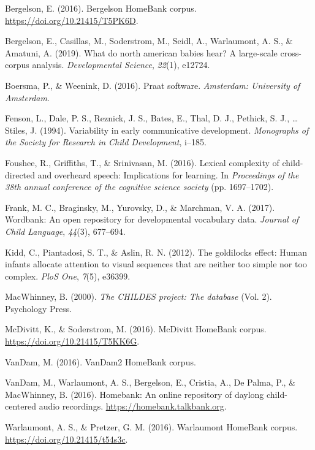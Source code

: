 \documentclass[10pt, letterpaper]{article}
\newenvironment{CSLReferences}%
  {}%
  {\par}
\begin{document}
\hypertarget{refs}{}
\begin{CSLReferences}{1}{0}
\leavevmode\hypertarget{ref-bergelsoncorpus}{}%
Bergelson, E. (2016). Bergelson HomeBank corpus.
\url{https://doi.org/10.21415/T5PK6D}.

\leavevmode\hypertarget{ref-bergelson2019north}{}%
Bergelson, E., Casillas, M., Soderstrom, M., Seidl, A., Warlaumont, A.
S., \& Amatuni, A. (2019). What do north american babies hear? A
large-scale cross-corpus analysis. \emph{Developmental Science},
\emph{22}(1), e12724.

\leavevmode\hypertarget{ref-boersma2016praat}{}%
Boersma, P., \& Weenink, D. (2016). Praat software. \emph{Amsterdam:
University of Amsterdam}.

\leavevmode\hypertarget{ref-fenson1994variability}{}%
Fenson, L., Dale, P. S., Reznick, J. S., Bates, E., Thal, D. J.,
Pethick, S. J., \ldots{} Stiles, J. (1994). Variability in early
communicative development. \emph{Monographs of the Society for Research
in Child Development}, i--185.

\leavevmode\hypertarget{ref-foushee2016lexical}{}%
Foushee, R., Griffiths, T., \& Srinivasan, M. (2016). Lexical complexity
of child-directed and overheard speech: Implications for learning. In
\emph{Proceedings of the 38th annual conference of the cognitive science
society} (pp. 1697--1702).

\leavevmode\hypertarget{ref-frank2017wordbank}{}%
Frank, M. C., Braginsky, M., Yurovsky, D., \& Marchman, V. A. (2017).
Wordbank: An open repository for developmental vocabulary data.
\emph{Journal of Child Language}, \emph{44}(3), 677--694.

\leavevmode\hypertarget{ref-kidd2012goldilocks}{}%
Kidd, C., Piantadosi, S. T., \& Aslin, R. N. (2012). The goldilocks
effect: Human infants allocate attention to visual sequences that are
neither too simple nor too complex. \emph{PloS One}, \emph{7}(5),
e36399.

\leavevmode\hypertarget{ref-macwhinney2000childes}{}%
MacWhinney, B. (2000). \emph{The CHILDES project: The database} (Vol.
2). Psychology Press.

\leavevmode\hypertarget{ref-soderstromcorpus}{}%
McDivitt, K., \& Soderstrom, M. (2016). McDivitt HomeBank corpus.
\url{https://doi.org/10.21415/T5KK6G}.

\leavevmode\hypertarget{ref-vandamcorpus}{}%
VanDam, M. (2016). VanDam2 HomeBank corpus.

\leavevmode\hypertarget{ref-homebank}{}%
VanDam, M., Warlaumont, A. S., Bergelson, E., Cristia, A., De Palma, P.,
\& MacWhinney, B. (2016). Homebank: An online repository of daylong
child-centered audio recordings. \url{https://homebank.talkbank.org}.

\leavevmode\hypertarget{ref-warlaumontcorpus}{}%
Warlaumont, A. S., \& Pretzer, G. M. (2016). Warlaumont HomeBank corpus.
\url{https://doi.org/10.21415/t54s3c}.

\end{CSLReferences}


\end{document}
